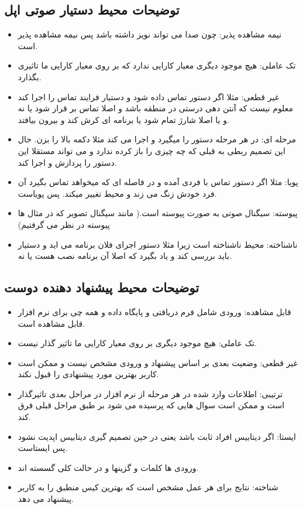 \documentclass[paper=a4, fontsize=11pt]{article}
\begin{document}
\subsection{توضیحات محیط  دستیار صوتی اپل}
\begin{itemize}
\item
نیمه مشاهده پذیر: چون صدا می تواند نویز داشته باشد پس نیمه مشاهده پذیر است.
\item
تک عاملی: هیچ موجود دیگری معیار کارایی ندارد که بر روی معیار کارایی ما تاثیری بگذارد.
\item
غیر قطعی: مثلا اگر دستور تماس داده شود و دستیار فرایند تماس را اجرا کند معلوم نیست که آنتن دهی درستی در منطقه باشد و اصلا تماس بر قرار شود یا نه و یا اصلا شارژ تمام شود یا برنامه ای کرش کند و بیرون بیافتد.
\item
مرحله ای: در هر مرحله دستور را میگیرد و اجرا می کند مثلا دکمه بالا را بزن. حال این تصمیم ربطی به قبلی که چه چیزی را باز کرده ندارد و می تواند مستقلا این دستور را پردازش و اجرا کند.
\item
پویا: مثلا اگر دستور تماس با فردی آمده و در فاصله ای که میخواهد تماس بگیرد آن فرد خودش زنگ می زند و محیط تغییر میکند. پس پویاست.
\item
پیوسته: سیگنال صوتی به صورت پیوسته است.( مانند سیگنال تصویر که در مثال ها پیوسته در نظر می گرفتیم)
\item
ناشناخته: محیط ناشناخته است زیرا مثلا دستور اجرای فلان برنامه می اید و دستیار باید بررسی کند و یاد بگیرد که اصلا آن برنامه نصب هست یا نه.

\end{itemize}

\subsection{توضیحات محیط  پیشنهاد دهنده دوست}
\begin{itemize}
\item
قابل مشاهده: ورودی شامل فرم دریافتی و پایگاه داده و همه چی برای نرم افزار قابل مشاهده است.
\item
تک عاملی: هیچ موجود دیگری بر روی معیار کارایی ما تاثیر گذار نیست.
\item
غیر قطعی: وضعیت بعدی بر اساس پیشنهاد و ورودی مشخص نیست و ممکن است کاربر بهترین مورد پیشنهادی را قبول نکند.
\item
ترتیبی: اطلاعات وارد شده در هر مرحله از نرم افزار در مراحل بعدی تاثیرگذار است و ممکن است سوال هایی که پرسیده می شود بر طبق مراحل قبلی فرق کند.
\item
ایستا: اگر دیتابیس افراد ثابت باشد یعنی در حین تصمیم گیری دیتابیس اپدیت نشود پس ایستاست.
\item
ورودی ها کلمات و گزینها و در حالت کلی گسسته اند.
\item
شناخته: نتایج برای هر عمل مشخص است که بهترین کیس منطبق را به کاربر پیشنهاد می دهد.
\end{itemize}
\end{document}
